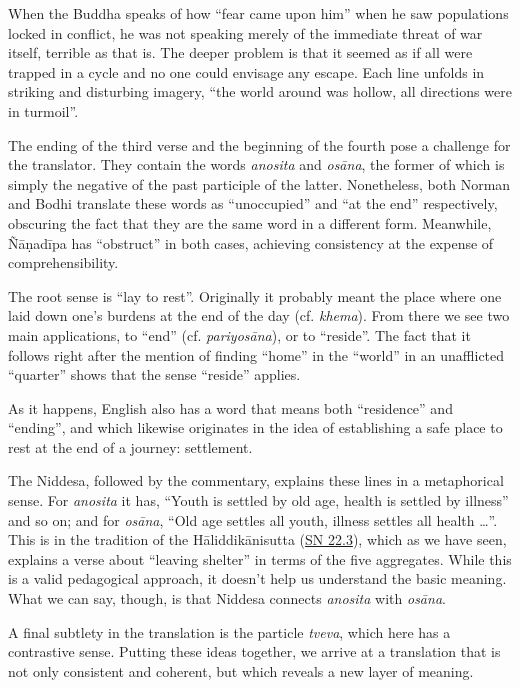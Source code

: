 \documentclass[12pt,openany]{book}%
\begin{document}
When the Buddha speaks of how “fear came upon him” when he saw populations locked in conflict, he was not speaking merely of the immediate threat of war itself, terrible as that is. The deeper problem is that it seemed as if all were trapped in a cycle and no one could envisage any escape. Each line unfolds in striking and disturbing imagery, “the world around was hollow, all directions were in turmoil”.

The ending of the third verse and the beginning of the fourth pose a challenge for the translator. They contain the words \textit{anosita} and \textit{\textsanskrit{osāna}}, the former of which is simply the negative of the past participle of the latter. Nonetheless, both Norman and Bodhi translate these words as “unoccupied” and “at the end” respectively, obscuring the fact that they are the same word in a different form. Meanwhile, \textsanskrit{Ñāṇadīpa} has “obstruct” in both cases, achieving consistency at the expense of comprehensibility.

The root sense is “lay to rest”. Originally it probably meant the place where one laid down one’s burdens at the end of the day (cf. \textit{khema}). From there we see two main applications, to “end” (cf. \textit{\textsanskrit{pariyosāna}}), or to “reside”. The fact that it follows right after the mention of finding “home” in the “world” in an unafflicted “quarter” shows that the sense “reside” applies.

As it happens, English also has a word that means both “residence” and “ending”, and which likewise originates in the idea of establishing a safe place to rest at the end of a journey: settlement.

The Niddesa, followed by the commentary, explains these lines in a metaphorical sense. For \textit{anosita} it has, “Youth is settled by old age, health is settled by illness” and so on; and for \textit{\textsanskrit{osāna}}, “Old age settles all youth, illness settles all health …”. This is in the tradition of the \textsanskrit{Hāliddikānisutta} (\href{https://suttacentral.net/sn22.3/en/sujato}{SN 22.3}), which as we have seen, explains a verse about “leaving shelter” in terms of the five aggregates. While this is a valid pedagogical approach, it doesn’t help us understand the basic meaning. What we can say, though, is that Niddesa connects \textit{anosita} with \textit{\textsanskrit{osāna}}.

A final subtlety in the translation is the particle \textit{tveva}, which here has a contrastive sense. Putting these ideas together, we arrive at a translation that is not only consistent and coherent, but which reveals a new layer of meaning.
\end{document}
